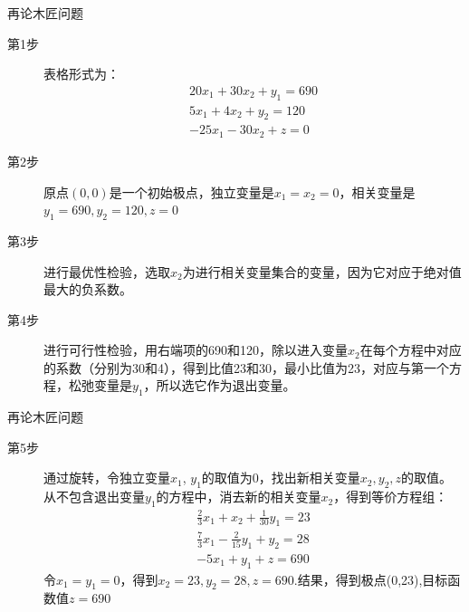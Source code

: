 \documentclass[mathserif, table]{beamer}
\begin{document}
\begin{frame}{再论木匠问题}
  \begin{description}
  \item[第1步] 表格形式为：
    \[
    \begin{array}{c}
      20x_1 + 30x_2 + y_1 = 690\\
      5x_1 + 4x_2 + y_2 =  120\\
      -25x_1 - 30x_2 + z = 0
    \end{array}
    \]
  \item[第2步] 原点$(0,0)$是一个初始极点，独立变量是$x_1=x_2=0$，相关变量是$y_1=690, y_2=120, z=0$
  \item[第3步] 进行最优性检验，选取$x_2$为进行相关变量集合的变量，因为它对应于绝对值最大的负系数。
  \item[第4步] 进行可行性检验，用右端项的690和120，除以进入变量$x_2$在每个方程中对应的系数（分别为30和4），得到比值23和30，最小比值为23，对应与第一个方程，松弛变量是$y_1$，所以选它作为退出变量。
  \end{description}

\end{frame}

\begin{frame}{再论木匠问题}
  \begin{description}
  \item[第5步] 通过旋转，令独立变量$x_1$, $y_1$的取值为0，找出新相关变量$x_2, y_2, z$的取值。从不包含退出变量$y_1$的方程中，消去新的相关变量$x_2$，得到等价方程组：
    \[
    \begin{array}{c}
      \frac{2}{3}x_1 + x_2 + \frac{1}{30}y_1 = 23\\
      \frac{7}{3}x_1 - \frac{2}{15}y_1 + y_2 =  28\\
      -5x_1 + y_1 + z = 690
    \end{array}
    \]
    令$x_1=y_1=0$，得到$x_2=23, y_2=28,z=690$.结果，得到极点(0,23),目标函数值$z=690$
  \end{description}
  
\end{frame}
\end{document}
